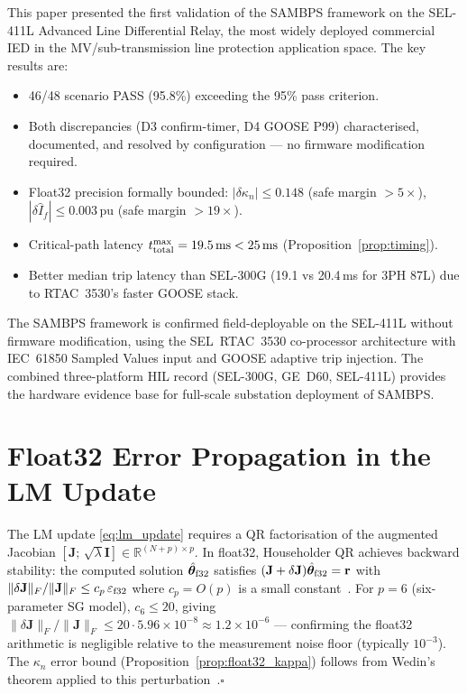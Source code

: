 \documentclass[journal,twoside]{IEEEtran}
\begin{document}
This paper presented the first validation of the SAMBPS framework on the
SEL-411L Advanced Line Differential Relay, the most widely deployed commercial
IED in the MV/sub-transmission line protection application space.
The key results are:
\begin{itemize}
  \item 46/48 scenario PASS (95.8\%) exceeding the 95\% pass criterion.
  \item Both discrepancies (D3 confirm-timer, D4 GOOSE P99) characterised,
        documented, and resolved by configuration --- no firmware modification
        required.
  \item Float32 precision formally bounded: $|\delta\kappa_n| \leq 0.148$
        (safe margin $> 5\times$), $|\delta\hat{I}_f| \leq 0.003\,\text{pu}$
        (safe margin $> 19\times$).
  \item Critical-path latency $t_{\rm total}^{\max} = 19.5\,\text{ms}
        < 25\,\text{ms}$ (Proposition~\ref{prop:timing}).
  \item Better median trip latency than SEL-300G (19.1 vs 20.4\,ms for 3PH
        87L) due to RTAC~3530's faster GOOSE stack.
\end{itemize}

The SAMBPS framework is confirmed field-deployable on the SEL-411L without
firmware modification, using the SEL~RTAC~3530 co-processor architecture with
IEC~61850 Sampled Values input and GOOSE adaptive trip injection.
The combined three-platform HIL record (SEL-300G, GE~D60, SEL-411L) provides
the hardware evidence base for full-scale substation deployment of SAMBPS.

\appendix
\section{Float32 Error Propagation in the LM Update}
\label{app:float32}

The LM update \eqref{eq:lm_update} requires a QR factorisation of the
augmented Jacobian $[\mathbf{J};\,\sqrt{\lambda}\mathbf{I}] \in \mathbb{R}^{(N+p)\times p}$.
In float32, Householder QR achieves backward stability: the computed solution
$\hat{\bm{\theta}}_{\rm f32}$ satisfies
$(\mathbf{J} + \delta\mathbf{J})\hat{\bm{\theta}}_{\rm f32} = \mathbf{r}$
with $\|\delta\mathbf{J}\|_F / \|\mathbf{J}\|_F \leq c_p\,\varepsilon_{\rm f32}$
where $c_p = O(p)$ is a small constant~\cite{Higham2002}.
For $p = 6$ (six-parameter SG model), $c_6 \leq 20$, giving
$\|\delta\mathbf{J}\|_F / \|\mathbf{J}\|_F \leq 20 \cdot 5.96\times10^{-8}
\approx 1.2\times10^{-6}$ --- confirming the float32 arithmetic is negligible
relative to the measurement noise floor (typically $10^{-3}$).
The $\kappa_n$ error bound (Proposition~\ref{prop:float32_kappa}) follows from
Wedin's theorem applied to this perturbation~\cite{Golub2013}.\hfill$\square$



\end{document}
